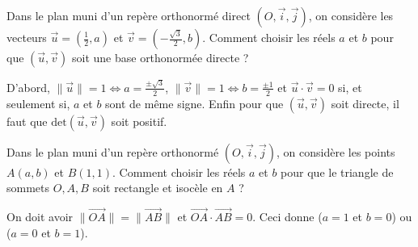 \begin{question}

Dans le plan muni d'un repère orthonormé direct $(O,\vec{i},\vec{j})$, on considère les vecteurs $\displaystyle \vec{u}=\left(\frac{1}{2},a\right)$ et $\displaystyle \vec{v}=\left(-\frac{\sqrt{3}}{2},b\right)$. Comment choisir les réels $a$ et $b$ pour que $(\vec{u},\vec{v})$ soit une base orthonormée directe ?
\begin{answers}  
\end{answers}
\begin{explanations}
D'abord, $\displaystyle \|\vec{u}\|=1\Leftrightarrow a=\frac{\pm \sqrt{3}}{2}$, $\displaystyle \|\vec{v}\|=1\Leftrightarrow b=\frac{\pm 1}{2}$ et $\vec{u}\cdot\vec{v}=0$ si, et seulement si, $a$ et $b$ sont de même signe. Enfin pour que $(\vec{u},\vec{v})$ soit directe, il faut que $\mbox{det}(\vec{u},\vec{v})$ soit positif.
\end{explanations}
\end{question}



\begin{question}

Dans le plan muni d'un repère orthonormé $(O,\vec{i},\vec{j})$, on considère les points $\displaystyle A(a,b)$ et $\displaystyle B(1,1)$. Comment choisir les réels $a$ et $b$ pour que le triangle de sommets $O,A,B$ soit rectangle et isocèle en $A$ ?
\begin{answers}  
\end{answers}
\begin{explanations}
On doit avoir $\displaystyle \|\overrightarrow{OA}\|=\|\overrightarrow{AB}\|$ et $\overrightarrow{OA}\cdot\overrightarrow{AB}=0$. Ceci donne ($a=1$ et $b=0$) ou ($a=0$ et $b=1$).
\end{explanations}
\end{question}



